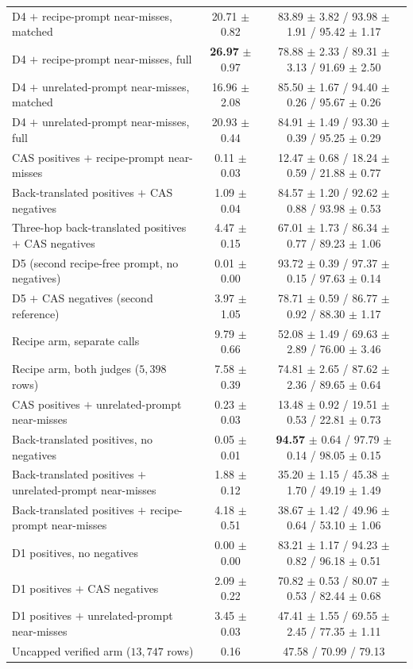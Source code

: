 \begin{table}[htbp]
{\begin{tabular}{lcc}
D4 $+$ recipe-prompt near-misses, matched & 20.71 $\pm$ 0.82 & 83.89 $\pm$ 3.82 / 93.98 $\pm$ 1.91 / 95.42 $\pm$ 1.17 \\
D4 $+$ recipe-prompt near-misses, full & \textbf{26.97} $\pm$ 0.97 & 78.88 $\pm$ 2.33 / 89.31 $\pm$ 3.13 / 91.69 $\pm$ 2.50 \\
D4 $+$ unrelated-prompt near-misses, matched & 16.96 $\pm$ 2.08 & 85.50 $\pm$ 1.67 / 94.40 $\pm$ 0.26 / 95.67 $\pm$ 0.26 \\
D4 $+$ unrelated-prompt near-misses, full & 20.93 $\pm$ 0.44 & 84.91 $\pm$ 1.49 / 93.30 $\pm$ 0.39 / 95.25 $\pm$ 0.29 \\
CAS positives $+$ recipe-prompt near-misses & 0.11 $\pm$ 0.03 & 12.47 $\pm$ 0.68 / 18.24 $\pm$ 0.59 / 21.88 $\pm$ 0.77 \\
Back-translated positives $+$ CAS negatives & 1.09 $\pm$ 0.04 & 84.57 $\pm$ 1.20 / 92.62 $\pm$ 0.88 / 93.98 $\pm$ 0.53 \\
Three-hop back-translated positives $+$ CAS negatives & 4.47 $\pm$ 0.15 & 67.01 $\pm$ 1.73 / 86.34 $\pm$ 0.77 / 89.23 $\pm$ 1.06 \\
D5 (second recipe-free prompt, no negatives) & 0.01 $\pm$ 0.00 & 93.72 $\pm$ 0.39 / 97.37 $\pm$ 0.15 / 97.63 $\pm$ 0.14 \\
D5 $+$ CAS negatives (second reference) & 3.97 $\pm$ 1.05 & 78.71 $\pm$ 0.59 / 86.77 $\pm$ 0.92 / 88.30 $\pm$ 1.17 \\
Recipe arm, separate calls & 9.79 $\pm$ 0.66 & 52.08 $\pm$ 1.49 / 69.63 $\pm$ 2.89 / 76.00 $\pm$ 3.46 \\
Recipe arm, both judges ($5{,}398$ rows) & 7.58 $\pm$ 0.39 & 74.81 $\pm$ 2.65 / 87.62 $\pm$ 2.36 / 89.65 $\pm$ 0.64 \\
CAS positives $+$ unrelated-prompt near-misses & 0.23 $\pm$ 0.03 & 13.48 $\pm$ 0.92 / 19.51 $\pm$ 0.53 / 22.81 $\pm$ 0.73 \\
Back-translated positives, no negatives & 0.05 $\pm$ 0.01 & \textbf{94.57} $\pm$ 0.64 / 97.79 $\pm$ 0.14 / 98.05 $\pm$ 0.15 \\
Back-translated positives $+$ unrelated-prompt near-misses & 1.88 $\pm$ 0.12 & 35.20 $\pm$ 1.15 / 45.38 $\pm$ 1.70 / 49.19 $\pm$ 1.49 \\
Back-translated positives $+$ recipe-prompt near-misses & 4.18 $\pm$ 0.51 & 38.67 $\pm$ 1.42 / 49.96 $\pm$ 0.64 / 53.10 $\pm$ 1.06 \\
D1 positives, no negatives & 0.00 $\pm$ 0.00 & 83.21 $\pm$ 1.17 / 94.23 $\pm$ 0.82 / 96.18 $\pm$ 0.51 \\
D1 positives $+$ CAS negatives & 2.09 $\pm$ 0.22 & 70.82 $\pm$ 0.53 / 80.07 $\pm$ 0.53 / 82.44 $\pm$ 0.68 \\
D1 positives $+$ unrelated-prompt near-misses & 3.45 $\pm$ 0.03 & 47.41 $\pm$ 1.55 / 69.55 $\pm$ 2.45 / 77.35 $\pm$ 1.11 \\
Uncapped verified arm ($13{,}747$ rows) & 0.16 & 47.58 / 70.99 / 79.13 \\
\bottomrule
\end{tabular}}
\end{table}


